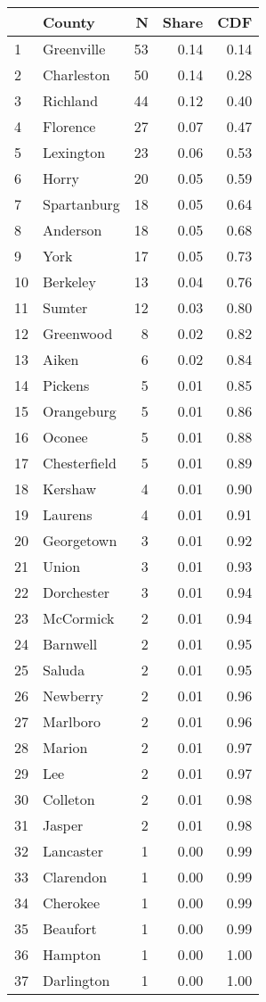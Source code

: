 \begin{tabular}{llrrr}
\toprule
{} &        County &   N &  Share &  CDF \\
\midrule
1  &    Greenville &  53 &   0.14 & 0.14 \\
2  &    Charleston &  50 &   0.14 & 0.28 \\
3  &      Richland &  44 &   0.12 & 0.40 \\
4  &      Florence &  27 &   0.07 & 0.47 \\
5  &     Lexington &  23 &   0.06 & 0.53 \\
6  &         Horry &  20 &   0.05 & 0.59 \\
7  &   Spartanburg &  18 &   0.05 & 0.64 \\
8  &      Anderson &  18 &   0.05 & 0.68 \\
9  &          York &  17 &   0.05 & 0.73 \\
10 &      Berkeley &  13 &   0.04 & 0.76 \\
11 &        Sumter &  12 &   0.03 & 0.80 \\
12 &     Greenwood &   8 &   0.02 & 0.82 \\
13 &         Aiken &   6 &   0.02 & 0.84 \\
14 &       Pickens &   5 &   0.01 & 0.85 \\
15 &    Orangeburg &   5 &   0.01 & 0.86 \\
16 &        Oconee &   5 &   0.01 & 0.88 \\
17 &  Chesterfield &   5 &   0.01 & 0.89 \\
18 &       Kershaw &   4 &   0.01 & 0.90 \\
19 &       Laurens &   4 &   0.01 & 0.91 \\
20 &    Georgetown &   3 &   0.01 & 0.92 \\
21 &         Union &   3 &   0.01 & 0.93 \\
22 &    Dorchester &   3 &   0.01 & 0.94 \\
23 &     McCormick &   2 &   0.01 & 0.94 \\
24 &      Barnwell &   2 &   0.01 & 0.95 \\
25 &        Saluda &   2 &   0.01 & 0.95 \\
26 &      Newberry &   2 &   0.01 & 0.96 \\
27 &      Marlboro &   2 &   0.01 & 0.96 \\
28 &        Marion &   2 &   0.01 & 0.97 \\
29 &           Lee &   2 &   0.01 & 0.97 \\
30 &      Colleton &   2 &   0.01 & 0.98 \\
31 &        Jasper &   2 &   0.01 & 0.98 \\
32 &     Lancaster &   1 &   0.00 & 0.99 \\
33 &     Clarendon &   1 &   0.00 & 0.99 \\
34 &      Cherokee &   1 &   0.00 & 0.99 \\
35 &      Beaufort &   1 &   0.00 & 0.99 \\
36 &       Hampton &   1 &   0.00 & 1.00 \\
37 &    Darlington &   1 &   0.00 & 1.00 \\
\bottomrule
\end{tabular}
